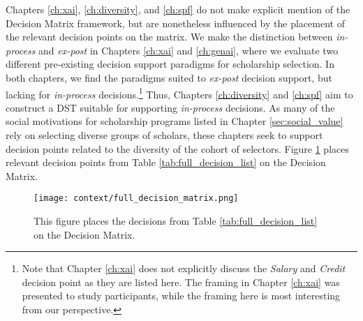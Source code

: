 Chapters \ref{ch:xai}, \ref{ch:diversity}, and \ref{ch:spf} do not make explicit mention of the Decision Matrix framework, but are nonetheless influenced by the placement of the relevant decision points on the matrix. We make the distinction between \emph{in-process} and \emph{ex-post} in Chapters \ref{ch:xai} and \ref{ch:genai}, where we evaluate two different pre-existing decision support paradigms for scholarship selection. In both chapters, we find the paradigms suited to \emph{ex-post} decision support, but lacking for \emph{in-process} decisions.\footnote{Note that Chapter \ref{ch:xai} does not explicitly discuss the \emph{Salary} and \emph{Credit} decision point as they are listed here. The framing in Chapter \ref{ch:xai} was presented to study participants, while the framing here is most interesting from our perspective.} Thus, Chapters \ref{ch:diversity} and \ref{ch:spf} aim to construct a DST suitable for supporting \emph{in-process} decisions. As many of the social motivations for scholarship programs listed in Chapter \ref{sec:social_value} rely on selecting diverse groups of scholars, these chapters seek to support decision points related to the diversity of the cohort of selectors. Figure \ref{fig:full_decision_matrix} places relevant decision points from Table \ref{tab:full_decision_list} on the Decision Matrix.

\begin{figure}[htbp]
  \centering
  \texttt{[image: context/full\_decision\_matrix.png]}
  \caption{This figure places the decisions from Table \ref{tab:full_decision_list} on the Decision Matrix.}
  \label{fig:full_decision_matrix}
\end{figure}